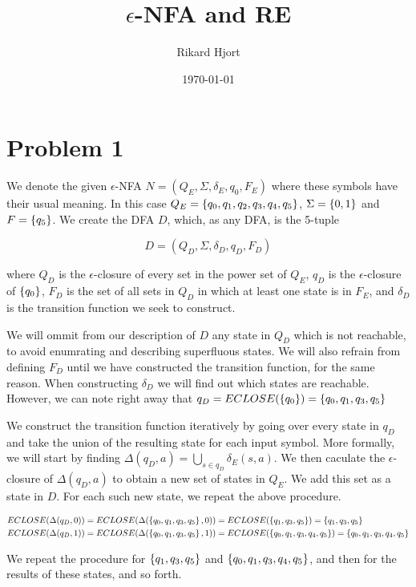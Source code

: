 \documentclass{article}
\title{$\epsilon$-NFA and RE}
\date{\today}
\author{Rikard Hjort}
\begin{document}
\maketitle

\section*{Problem 1}

We denote the given $\epsilon$-NFA $N = (Q_E, \Sigma, \delta_E, q_0, F_E)$ where these symbols have their usual meaning. In this case $Q_E = \set{q_0, q_1, q_2, q_3, q_4, q_5}$, $\Sigma = \set{0,1}$ and $F = \set{q_5}$. We create the DFA $D$, which, as any DFA, is the 5-tuple

$$D = (Q_D, \Sigma, \delta_D, q_D, F_D)$$

where $Q_D$ is the $\epsilon$-closure of every set in the power set of $Q_E$, $q_D$ is the $\epsilon$-closure of $\set{q_0}$, $F_D$ is the set of all sets in $Q_D$ in which at least one state is in $F_E$, and $\delta_D$ is the transition function we seek to construct. 

We will ommit from our description of $D$ any state in $Q_D$ which is not reachable, to avoid enumrating and describing superfluous states. We will also refrain from defining $F_D$ until we have constructed the transition function, for the same reason. When constructing $\delta_D$ we will find out which states are reachable. However, we can note right away that $q_D = ECLOSE(\set{q_0}) = \set{q_0, q_1, q_3, q_5}$

We construct the transition function iteratively by going over every state in $q_D$ and take the union of the resulting state for each input symbol. More formally, we will start by finding $\Delta (q_D, a) = \bigcup_{s \in q_D}\delta_E(s, a)$. We then caculate the $\epsilon$-closure of $\Delta(q_D, a)$ to obtain a new set of states in $Q_E$. We add this set as a state in $D$. For each such new state, we repeat the above procedure.

\begin{align*}
    ECLOSE(\Delta(q_D,0)) &=ECLOSE(\Delta(\set{q_0, q_1,q_3,q_5}, 0)) = ECLOSE(\set{q_1,q_3,q_5}) = \set{q_1, q_3, q_5} \\
    ECLOSE(\Delta(q_D,1)) &=ECLOSE(\Delta(\set{q_0, q_1,q_3,q_5}, 1)) = ECLOSE(\set{q_0, q_1, q_3, q_4, q_5}) = \set{q_0,q_1, q_3,q_4, q_5}
\end{align*}

We repeat the procedure for $\set{q_1,q_3,q_5}$ and $\set{q_0, q_1, q_3, q_4, q_5}$, and then for the results of these states, and so forth.
\end{document}
